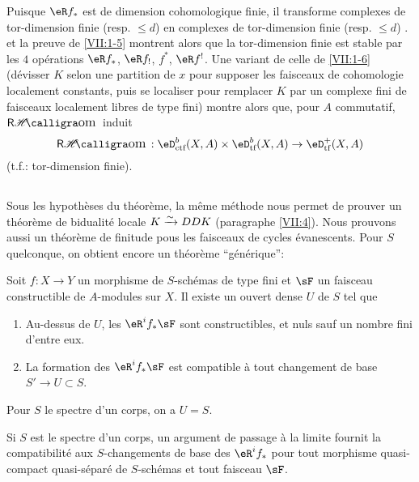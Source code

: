 Puisque $\eR f_\ast$ est de dimension cohomologique finie, il transforme 
complexes de tor-dimension finie (resp. $\leqslant d$) en complexes de 
tor-dimension finie (resp. $\leqslant d$) \cite[XVII 5.2.11]{sga4}. 
\cite[XVII 5.2.10]{sga4} et la preuve de \ref{VII:1-5} montrent alors que la 
tor-dimension finie est stable par les $4$ op\'erations $\eR f_\ast$, 
$\eR f_!$, $f^\ast$, $\eR f^!$. Une variant de celle de \ref{VII:1-6} 
(d\'evisser $K$ selon une partition de $x$ pour supposer les faisceaux de 
cohomologie localement constants, puis se localiser pour remplacer $K$ par un 
complexe fini de faisceaux localement libres de type fini) montre alors que, 
pour $A$ commutatif, $\rHom$ induit 
\[
  \rHom:\eD_\text{ctf}^b(X,A)\times \eD_\text{tf}^b(X,A) \to \eD_\text{tf}^+(X,A) 
\]
(t.f.: tor-dimension finie). 





\subsection{}\label{VII:1-8}

Sous les hypoth\`eses du th\'eor\`eme, la m\^eme m\'ethode nous permet de 
prouver un th\'eor\`eme de bidualit\'e locale $K\xrightarrow\sim D D K$ (paragraphe 
\ref{VII:4}). Nous prouvons aussi un th\'eor\`eme de finitude pous les 
faisceaux de cycles \'evanescents. Pour $S$ quelconque, on obtient encore un 
th\'eor\`eme ``g\'en\'erique'': 





\begin{theorem_}\label{VII:1-9}
Soit $f:X\to Y$ un morphisme de $S$-sch\'emas de type fini et $\sF$ un faisceau 
constructible de $A$-modules sur $X$. Il existe un ouvert dense $U$ de $S$ tel 
que 
\begin{enumerate}[\indent (i)]
  \item Au-dessus de $U$, les $\eR^i f_\ast \sF$ sont constructibles, et nuls 
    sauf un nombre fini d'entre eux. 
  \item La formation des $\eR^i f_\ast \sF$ est compatible \`a tout 
    changement de base $S' \to U\subset S$. 
\end{enumerate}
\end{theorem_}

Pour $S$ le spectre d'un corps, on a $U=S$. 

Si $S$ est le spectre d'un corps, un argument de passage \`a la limite fournit 
la compatibilit\'e aux $S$-changements de base des $\eR^i f_\ast$ pour tout 
morphisme quasi-compact quasi-s\'epar\'e de $S$-sch\'emas et tout faisceau 
$\sF$. 





